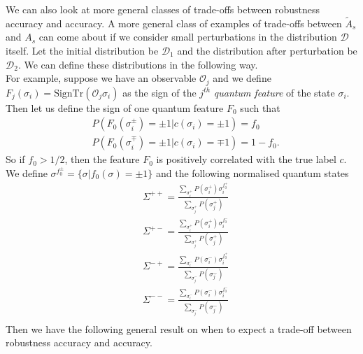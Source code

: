 \documentclass[onecolumn,prx, superscriptaddress,longbibliography,margin=1mm 11pt]{revtex4-2}
\begin{document}
We can also look at more general classes of trade-offs between robustness accuracy and accuracy. A more general class of examples of trade-offs between $\tilde{A}_s$ and $A_s$ can come about if we consider small perturbations in the distribution $\mathcal{D}$ itself. Let the initial distribution be $\mathcal{D}_1$ and the distribution after perturbation be $\mathcal{D}_2$. We can define these distributions in the following way.\\

For example, suppose we have an observable $\mathcal{O}_j$ and we define $F_j(\sigma_i)=\text{Sign}\text{Tr}(\mathcal{O}_j\sigma_i)$ as the sign of the $j^{th}$ \textit{quantum feature} of the state $\sigma_i$. Then let us define the sign of one quantum feature $F_0$ such that 
\begin{align}
   &  P(F_0(\sigma^{\pm}_i)=\pm 1|c(\sigma_i)=\pm 1)=f_0 \\
    \nonumber 
    & P(F_0(\sigma^{\mp}_i)=\pm 1|c(\sigma_i)=\mp 1)=1-f_0.
\end{align}
So if $f_0>1/2$, then the feature $F_0$ is positively correlated with the true label $c$. We define $\sigma^{f_0^{\pm}}=\{\sigma| f_0(\sigma)=\pm 1\}$ and the following normalised quantum states 
\begin{align}
    & \Sigma^{++}=\frac{\sum_{\sigma_i^+} P(\sigma_i^+)\sigma^{f_0^+}_i}{\sum_{\sigma_j^+} P(\sigma_j^+)} \nonumber \\
    &\Sigma^{+-}=\frac{\sum_{\sigma_i^+} P(\sigma_i^+)\sigma^{f_0^-}_i}{\sum_{\sigma_j^+} P(\sigma_j^+)} \nonumber \\
    &\Sigma^{-+}=\frac{\sum_{\sigma_i^-} P(\sigma_i^-)\sigma^{f_0^+}_i}{\sum_{\sigma_j^-} P(\sigma_j^-)} \nonumber \\
     &\Sigma^{--}=\frac{\sum_{\sigma_i^-} P(\sigma_i^-)\sigma^{f_0^-}_i}{\sum_{\sigma_j^-} P(\sigma_j^-)} \nonumber \\
\end{align}
Then we have the following general result on when to expect a trade-off between robustness accuracy and accuracy. \\
\end{document}
